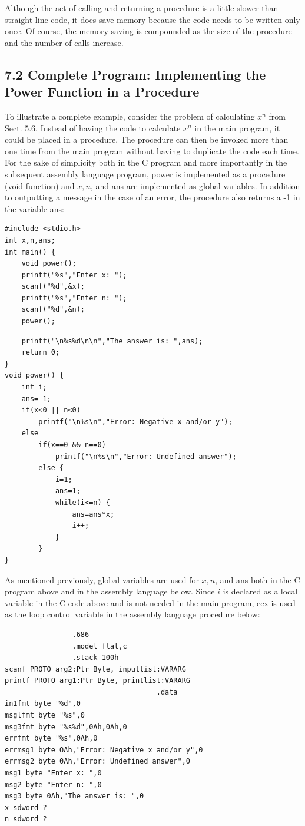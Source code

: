 \documentclass[10pt]{book}
\begin{document}
\begin{center}
\begin{center}
Although the act of calling and returning a procedure is a little slower than straight line code, it does save memory because the code needs to be written only once. Of course, the memory saving is compounded as the size of the procedure and the number of calls increase.


\subsection*{7.2 Complete Program: Implementing the Power Function in a Procedure}
To illustrate a complete example, consider the problem of calculating $x^{n}$ from Sect. 5.6. Instead of having the code to calculate $x^{n}$ in the main program, it could be placed in a procedure. The procedure can then be invoked more than one time from the main program without having to duplicate the code each time. For the sake of simplicity both in the C program and more importantly in the subsequent assembly language program, power is implemented as a procedure (void function) and $x, n$, and ans are implemented as global variables. In addition to outputting a message in the case of an error, the procedure also returns a -1 in the variable ans:

\begin{verbatim}
#include <stdio.h>
int x,n,ans;
int main() {
    void power();
    printf("%s","Enter x: ");
    scanf("%d",&x);
    printf("%s","Enter n: ");
    scanf("%d",&n);
    power();
\end{verbatim}

\begin{verbatim}
    printf("\n%s%d\n\n","The answer is: ",ans);
    return 0;
}
void power() {
    int i;
    ans=-1;
    if(x<0 || n<0)
        printf("\n%s\n","Error: Negative x and/or y");
    else
        if(x==0 && n==0)
            printf("\n%s\n","Error: Undefined answer");
        else {
            i=1;
            ans=1;
            while(i<=n) {
                ans=ans*x;
                i++;
            }
        }
}
\end{verbatim}

As mentioned previously, global variables are used for $x, n$, and ans both in the C program above and in the assembly language below. Since $i$ is declared as a local variable in the C code above and is not needed in the main program, ecx is used as the loop control variable in the assembly language procedure below:

\begin{verbatim}
                .686
                .model flat,c
                .stack 100h
scanf PROTO arg2:Ptr Byte, inputlist:VARARG
printf PROTO arg1:Ptr Byte, printlist:VARARG
                                    .data
in1fmt byte "%d",0
msglfmt byte "%s",0
msg3fmt byte "%s%d",0Ah,0Ah,0
errfmt byte "%s",0Ah,0
errmsg1 byte OAh,"Error: Negative x and/or y",0
errmsg2 byte 0Ah,"Error: Undefined answer",0
msg1 byte "Enter x: ",0
msg2 byte "Enter n: ",0
msg3 byte 0Ah,"The answer is: ",0
x sdword ?
n sdword ?
\end{verbatim}


\end{center}
\end{center}
\end{document}
